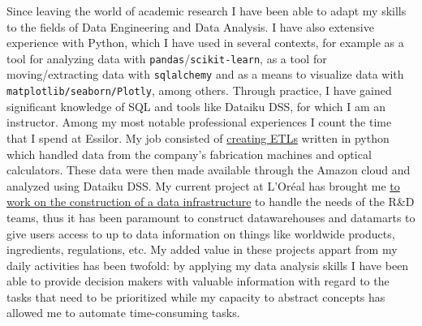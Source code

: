 \documentclass[11pt, a4paper]{awesome-cv}
\begin{document}
\begin{cvletter}
Since leaving the world of academic research I have been able to adapt my skills to the fields of Data Engineering and Data Analysis. 
I have also extensive experience with Python, which I have used in several contexts, for example as a tool for analyzing data with 
\texttt{pandas}/\texttt{scikit-learn}, as a tool for moving/extracting data with \texttt{sqlalchemy} and as a means to visualize data with 
\texttt{matplotlib/seaborn/Plotly}, among others. Through practice, I have gained significant knowledge of SQL and tools like Dataiku DSS, 
for which I am an instructor.
Among my most notable professional experiences I count the time that I spend at Essilor. My job consisted of \underline{creating ETLs} written in python which 
handled data from the company's fabrication machines and optical calculators. These data were then made available through the Amazon cloud and analyzed 
using Dataiku DSS. My current project at L'Oréal has brought me \underline{to work on the construction of a data infrastructure} to handle the needs of the R\&D teams, 
thus it has been paramount to construct datawarehouses and datamarts to give users access to up to data information on things like worldwide products, ingredients, 
regulations, etc.  My added value in these projects appart from my daily activities has been twofold: by applying my data analysis skills I have been able to 
provide decision makers with valuable information with regard to the tasks that need to be prioritized while my capacity to abstract concepts has allowed me to 
automate time-consuming tasks.


\end{cvletter}
\end{document}
